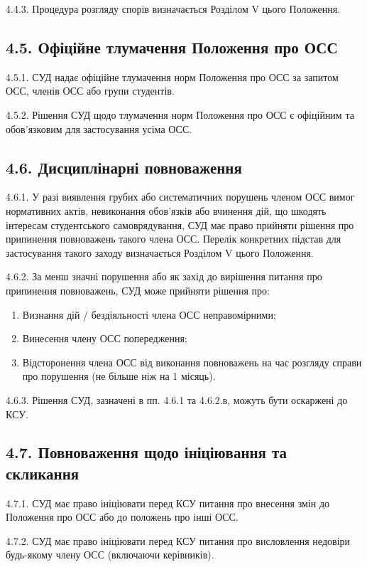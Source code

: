     4.4.3. Процедура розгляду спорів визначається Розділом V цього Положення.

\subsection*{4.5. Офіційне тлумачення Положення про ОСС}
    4.5.1. СУД надає офіційне тлумачення норм Положення про ОСС за запитом ОСС, членів ОСС або групи студентів.

    4.5.2. Рішення СУД щодо тлумачення норм Положення про ОСС є офіційним та обов'язковим для застосування усіма ОСС.

\subsection*{4.6. Дисциплінарні повноваження}
    4.6.1. У разі виявлення грубих або систематичних порушень членом ОСС вимог нормативних актів, невиконання обов'язків або вчинення дій, що шкодять інтересам студентського самоврядування, СУД має право прийняти рішення про припинення повноважень такого члена ОСС. Перелік конкретних підстав для застосування такого заходу визначається Розділом V цього Положення.

    4.6.2. За менш значні порушення або як захід до вирішення питання про припинення повноважень, СУД може прийняти рішення про:
        \begin{enumerate}[label=\alph*)]
            \item Визнання дій / бездіяльності члена ОСС неправомірними;
            \item Винесення члену ОСС попередження;
            \item Відсторонення члена ОСС від виконання повноважень на час розгляду справи про порушення (не більше ніж на 1 місяць).
        \end{enumerate}

    4.6.3. Рішення СУД, зазначені в пп. 4.6.1 та 4.6.2.в, можуть бути оскаржені до КСУ.

\subsection*{4.7. Повноваження щодо ініціювання та скликання}
    4.7.1. СУД має право ініціювати перед КСУ питання про внесення змін до Положення про ОСС або до положень про інші ОСС.

    4.7.2. СУД має право ініціювати перед КСУ питання про висловлення недовіри будь-якому члену ОСС (включаючи керівників).


